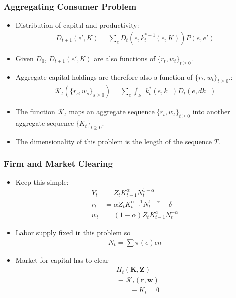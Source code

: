 \documentclass[english,xcolor=svgnames]{beamer}
\begin{document}
\begin{frame}
    \frametitle{Aggregating Consumer Problem}
    \begin{itemize}
        \item Distribution of capital and productivity:
        \begin{align*}
        	D_{t+1}(e',K) = \sum_e D_t(e,k_t^{*-1}(e,K))P(e,e')
        \end{align*}
        \item Given $D_0$, $D_{t+1}(e',K)$ are also functions of $\{r_t,w_t\}_{t\ge 0 }$.
        \item Aggregate capital holdings are therefore also a function of $\{r_t,w_t\}_{t\ge 0 }$.:
        \begin{align*}
        	\mathcal{K}_t(\{r_s,w_s\}_{s\ge 0 }) = \sum_e \int_{k_{-}} k_t^*(e,k_{-}) D_t(e,dk_{-})
        \end{align*}
        \item The function $\mathcal{K}_t$ maps an aggregate sequence $\{r_t,w_t\}_{t\ge 0 }$ into another aggregate sequence $\{K_t\}_{t\ge 0}$.
        \item The dimensionality of this problem is the length of the sequence $T$.
	\end{itemize}
\end{frame}


\begin{frame}
    \frametitle{Firm and Market Clearing}
    \begin{itemize}
        \item Keep this simple:
        \begin{align*}
        	Y_t &= Z_t K_{t-1}^{\alpha} N_t^{1-\alpha} \\
        	 r_t &= \alpha  Z_t K_{t-1}^{\alpha-1} N_t^{1-\alpha} - \delta \\
        	 w_t &= (1-\alpha) Z_t K_{t-1}^{\alpha} N_t^{-\alpha}
        \end{align*}
        \item Labor supply fixed in this problem so
        \begin{align*}
        	N_t = \sum \pi(e) en
        \end{align*}
        \item Market for capital has to clear
        \begin{align*}
        	&H_t(\bm{K},\bm{Z})  \\
        	&\equiv \mathcal{K}_t\left( \mathbf{r}, \mathbf{w} \right)\\
        	&\qquad  - K_t = 0
        \end{align*}
	\end{itemize}
\end{frame}
\end{document}
